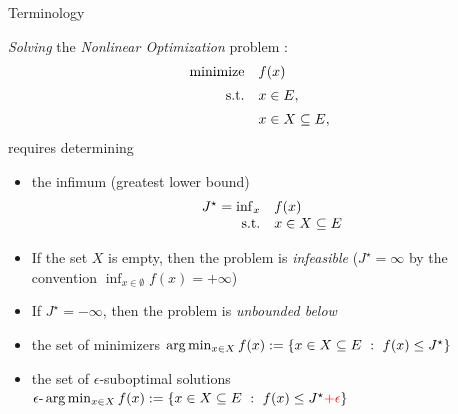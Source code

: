 \documentclass[9pt]{beamer}
\begin{document}
\begin{frame}{Terminology}

  \emph{Solving} the \emph{Nonlinear Optimization} problem :
  \[
    \begin{array}{rl}
      \operatorname{minimize} & f(x) \\[0.5em]
      \mathrm{s.t.} & x \in E, \\[0.5em]
                & x\in X \subseteq E,
    \end{array}
  \]
  requires determining
  \begin{itemize}
  \item<2-> the infimum (greatest lower bound)
    \[
      \begin{array}{rl}
        J^\star = \inf_x & f(x) \\
        \mathrm{s.t.} & x\in X \subseteq E
      \end{array}
    \]
  \item<3-> If the set $X$ is empty, then the problem is \emph{infeasible} ($J^\star=\infty$ by the convention $\inf_{x\in\emptyset} f(x) = +\infty$)
  \item<4-> If $J^\star = -\infty$, then the problem is \emph{unbounded below}
  \item<5-> the set of minimizers
     \(
      \arg \min_{x\in X} f(x) := \left\{ x\in X\subseteq E\ : \ f(x)\leq J^\star \right\}
    \)
  \item<5-> the set of $\epsilon$-suboptimal solutions
    \(
      \epsilon\text{-}\arg \min_{x\in X} f(x) := \left\{ x\in X\subseteq E\ : \ f(x)\leq J^\star{\color{red} +\epsilon} \right\}
    \)
  \end{itemize}
  
\end{frame}
\end{document}
